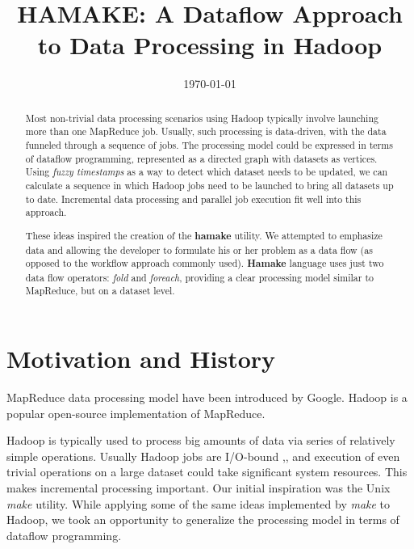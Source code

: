 \documentclass[10pt,conference,letterpaper]{IEEEtran}
\title{HAMAKE: A Dataflow Approach to Data Processing in Hadoop}
\author{\IEEEauthorblockN{Vadim Zaliva}
\IEEEauthorblockA{Codeminders\\
Email: lord@crocodile.org} \and \IEEEauthorblockN{Vladimir Orlov}
\IEEEauthorblockA{Codeminders\\
Email: vorl@codeminders.com}}
\date{\today}
\begin{document}
\lstset{language=XML,basicstyle=\tiny,markfirstintag=true,numbers=left,numbersep=1pt}

\maketitle

\begin{abstract}
  Most non-trivial data processing scenarios using Hadoop typically
  involve launching more than one MapReduce job. Usually, such
  processing is data-driven, with the data funneled through a sequence
  of jobs.  The processing model could be expressed in terms of
  dataflow programming, represented as a directed graph with datasets
  as vertices. Using \textit{fuzzy timestamps} as a way to detect
  which dataset needs to be updated, we can calculate a sequence in
  which Hadoop jobs need to be launched to bring all datasets up to
  date. Incremental data processing and parallel job execution fit
  well into this approach.

  These ideas inspired the creation of the \textbf{hamake} utility. We
  attempted to emphasize data and allowing the developer to formulate
  his or her problem as a data flow (as opposed to the workflow
  approach commonly used). \textbf{Hamake} language uses just two data
  flow operators: \emph{fold} and \emph{foreach}, providing a clear
  processing model similar to MapReduce, but on a dataset level.
\end{abstract}

\section{Motivation and History}

MapReduce data processing model have been introduced by
Google\cite{dean2008map}. Hadoop\cite{bialecki2005hadoop} is a popular
open-source implementation of MapReduce.

Hadoop is typically used to process big amounts of data via series of
relatively simple operations. Usually Hadoop jobs are I/O-bound
\cite{hadoopattwitter},\cite{hs2010hadoopbench}, and execution of even
trivial operations on a large dataset could take significant system
resources. This makes incremental processing important. Our initial
inspiration was the Unix \emph{make} utility. While applying some of the same ideas implemented by \emph{make}
to Hadoop, we took an opportunity to generalize the
processing model in terms of dataflow programming.
\end{document}
